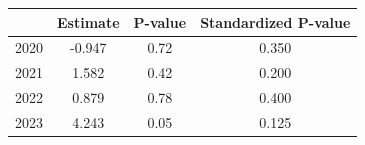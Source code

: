 \begin{tabular}{lccc}
\hline
 & Estimate & P-value & Standardized P-value \\
\hline
2020 & -0.947 & 0.72 & 0.350 \\
2021 & 1.582 & 0.42 & 0.200 \\
2022 & 0.879 & 0.78 & 0.400 \\
2023 & 4.243 & 0.05 & 0.125 \\
\hline
\end{tabular}
